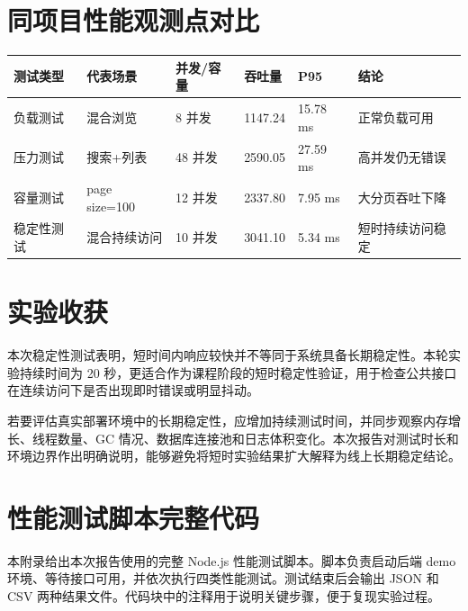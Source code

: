 \documentclass[UTF8,a4paper,12pt]{ctexart}
\begin{document}
\section{同项目性能观测点对比}
\begin{longtable}{P{2.3cm}P{2.2cm}P{2.0cm}P{2.0cm}P{2.0cm}P{3.0cm}}
\toprule
测试类型 & 代表场景 & 并发/容量 & 吞吐量 & P95 & 结论\\
\midrule
负载测试 & 混合浏览 & 8 并发 & 1147.24 & 15.78 ms & 正常负载可用\\
压力测试 & 搜索+列表 & 48 并发 & 2590.05 & 27.59 ms & 高并发仍无错误\\
容量测试 & page size=100 & 12 并发 & 2337.80 & 7.95 ms & 大分页吞吐下降\\
稳定性测试 & 混合持续访问 & 10 并发 & 3041.10 & 5.34 ms & 短时持续访问稳定\\
\bottomrule
\end{longtable}

\section{实验收获}
本次稳定性测试表明，短时间内响应较快并不等同于系统具备长期稳定性。本轮实验持续时间为 20 秒，更适合作为课程阶段的短时稳定性验证，用于检查公共接口在连续访问下是否出现即时错误或明显抖动。

若要评估真实部署环境中的长期稳定性，应增加持续测试时间，并同步观察内存增长、线程数量、GC 情况、数据库连接池和日志体积变化。本次报告对测试时长和环境边界作出明确说明，能够避免将短时实验结果扩大解释为线上长期稳定结论。

\clearpage
\appendix
\section{性能测试脚本完整代码}
本附录给出本次报告使用的完整 Node.js 性能测试脚本。脚本负责启动后端 demo 环境、等待接口可用，并依次执行四类性能测试。测试结束后会输出 JSON 和 CSV 两种结果文件。代码块中的注释用于说明关键步骤，便于复现实验过程。
\end{document}
